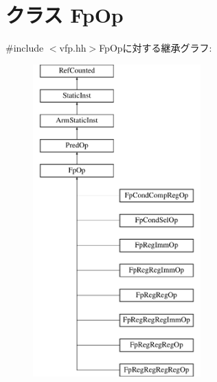 \hypertarget{classArmISA_1_1FpOp}{
\section{クラス FpOp}
\label{classArmISA_1_1FpOp}
}


{\ttfamily \#include $<$vfp.hh$>$}FpOpに対する継承グラフ:\begin{figure}[H]
\begin{center}
\leavevmode
\includegraphics[height=12cm]{classArmISA_1_1FpOp}
\end{center}
\end{figure}
